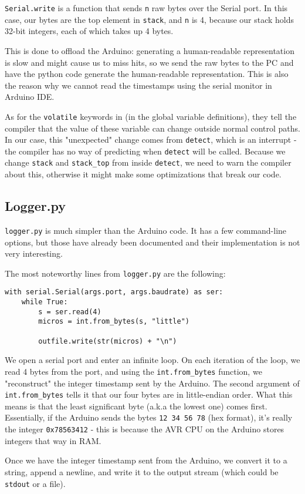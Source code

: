 \documentclass[11pt]{article}
\begin{document}
\texttt{Serial.write} is a function that sends \texttt{n} raw bytes over the Serial port. In this case, our bytes are the top element in \texttt{stack}, and \texttt{n} is 4, because our stack holds 32-bit integers, each of which takes up 4 bytes.

This is done to offload the Arduino: generating a human-readable representation is slow and might cause us to miss hits, so we send the raw bytes to the PC and have the python code generate the human-readable representation. This is also the reason why we cannot read the timestamps using the serial monitor in Arduino IDE.

As for the \texttt{volatile} keywords in (in the global variable definitions), they tell the compiler that the value of these variable can change outside normal control paths. In our case, this "unexpected" change comes from \texttt{detect}, which is an interrupt - the compiler has no way of predicting when \texttt{detect} will be called. Because we change \texttt{stack} and \texttt{stack\_top} from inside \texttt{detect}, we need to warn the compiler about this, otherwise it might make some optimizations that break our code.

\subsection{Logger.py}
\label{sec:org9461c54}
\texttt{logger.py} is much simpler than the Arduino code. It has a few command-line options, but those have already been documented and their implementation is not very interesting.

The most noteworthy lines from \texttt{logger.py} are the following:

\begin{verbatim}
with serial.Serial(args.port, args.baudrate) as ser:
    while True:
        s = ser.read(4)
        micros = int.from_bytes(s, "little")

        outfile.write(str(micros) + "\n")
\end{verbatim}

We open a serial port and enter an infinite loop. On each iteration of the loop, we read 4 bytes from the port, and using the \texttt{int.from\_bytes} function, we "reconstruct" the integer timestamp sent by the Arduino. The second argument of \texttt{int.from\_bytes} tells it that our four bytes are in little-endian order. What this means is that the least significant byte (a.k.a the lowest one) comes first. Essentially, if the Arduino sends the bytes \texttt{12 34 56 78} (hex format), it's really the integer \texttt{0x78563412} - this is because the AVR CPU on the Arduino stores integers that way in RAM.

Once we have the integer timestamp sent from the Arduino, we convert it to a string, append a newline, and write it to the output stream (which could be \texttt{stdout} or a file).
\end{document}

